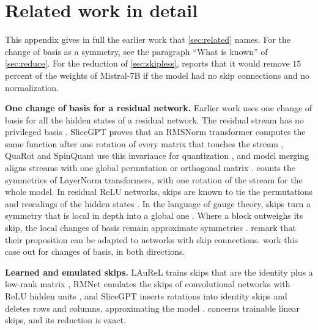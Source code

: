 \documentclass[10pt]{article}
\theoremstyle{definition}
\theoremstyle{remark}
\newcommand{\para}[1]{\smallskip\noindent\textbf{#1}\hspace{0.5em}}
\begin{document}
\section{Related work in detail}\label{app:related}

This appendix gives in full the earlier work that \cref{sec:related} names. For the change of basis as a symmetry, see the paragraph ``What is known'' of \cref{sec:reduce}. For the reduction of \cref{sec:skipless}, \citet{graef2024tricks} reports that it would remove $15$ percent of the weights of Mistral-7B if the model had no skip connections and no normalization.

\para{One change of basis for a residual network.} Earlier work uses one change of basis for all the hidden states of a residual network. The residual stream has no privileged basis \citep{elhage2021circuits}. SliceGPT proves that an RMSNorm transformer computes the same function after one rotation of every matrix that touches the stream \citep[Theorem~1]{ashkboos2024slicegpt}, QuaRot and SpinQuant use this invariance for quantization \citep{ashkboos2024quarot,liu2024spinquant}, and model merging aligns streams with one global permutation \citep[Section~3.3]{verma2024merging} or orthogonal matrix \citep{theus2025glmc}. \citet{vannierop2024gauge} counts the symmetries of LayerNorm transformers, with one rotation of the stream for the whole model. In residual ReLU networks, skips are known to tie the permutations and rescalings of the hidden states \citep[Remark~3.6]{godfrey2022symmetries}. In the language of gauge theory, skips turn a symmetry that is local in depth into a global one \citep{hashimoto2024unification}. Where a block outweighs its skip, the local changes of basis remain approximate symmetries \citep[Section~6.4]{gong2026aro}. \citet{zhao2023symmetries} remark that their proposition can be adapted to networks with skip connections.  work this case out for changes of basis, in both directions.

\para{Learned and emulated skips.} LAuReL trains skips that are the identity plus a low-rank matrix \citep{menghani2024laurel}, RMNet emulates the skips of convolutional networks with ReLU hidden units \citep{meng2021rmnet}, and SliceGPT inserts rotations into identity skips and deletes rows and columns, approximating the model \citep[Sections~3.3 and~3.4]{ashkboos2024slicegpt}.  concerns trainable linear skips, and its reduction is exact.
\end{document}
